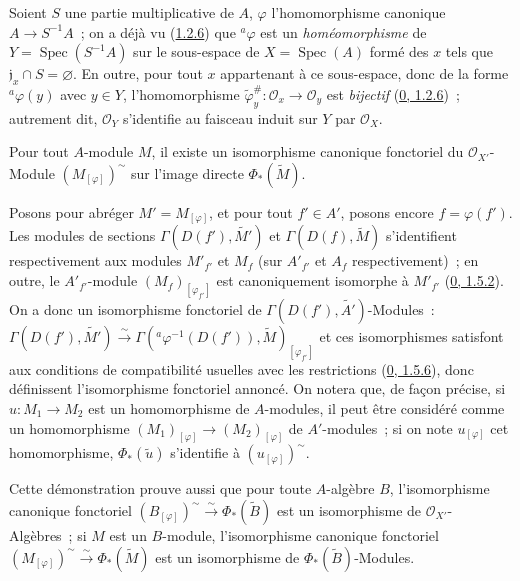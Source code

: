 \begin{example}[1.6.2]
\label{I.1.6.2-fr}
Soient $S$ une partie multiplicative de $A$, $\varphi$ l'homomorphisme
canonique $A\to S^{-1}A$~; on a déjà vu
(\hyperref[I.1.2.6-fr]{1.2.6}) que ${}^a\varphi$ est un
\emph{homéomorphisme} de $Y=\operatorname{Spec}(S^{-1}A)$ sur le
sous-espace de $X=\operatorname{Spec}(A)$ formé des $x$ tels que
$\mathfrak{j}_x\cap S=\varnothing$. En outre, pour tout $x$ appartenant à
ce sous-espace, donc de la forme ${}^a\varphi(y)$ avec $y\in Y$,
l'homomorphisme
$\widetilde{\varphi}_y^\#:\mathscr{O}_x\to\mathscr{O}_y$ est
\emph{bijectif} (\hyperref[0.1.2.6-fr]{0, 1.2.6})~; autrement dit,
$\mathscr{O}_Y$ s'identifie au faisceau induit sur $Y$ par $\mathscr{O}_X$.
\end{example}

\begin{proposition}[1.6.3]
\label{I.1.6.3-fr}
Pour tout $A$-module $M$, il existe un isomorphisme canonique fonctoriel du
$\mathscr{O}_{X'}$-Module $(M_{[\varphi]})^{\sim}$ sur l'image directe
$\Phi_*(\widetilde{M})$.
\end{proposition}

Posons pour abréger $M'=M_{[\varphi]}$, et pour tout $f'\in A'$, posons
encore $f=\varphi(f')$. Les modules de sections
$\Gamma(D(f'),\widetilde{M'})$ et $\Gamma(D(f),\widetilde{M})$
s'identifient respectivement aux modules $M'_{f'}$ et $M_f$ (sur
$A'_{f'}$ et $A_f$ respectivement)~; en outre, le $A'_{f'}$-module
$(M_f)_{[\varphi_{f'}]}$ est canoniquement isomorphe à $M'_{f'}$
(\hyperref[0.1.5.2-fr]{0, 1.5.2}). On a donc un isomorphisme fonctoriel de
$\Gamma(D(f'),\widetilde{A'})$-Modules~:
$\Gamma(D(f'),\widetilde{M'})\xrightarrow{\sim}
\Gamma({}^a\varphi^{-1}(D(f')),\widetilde{M})_{[\varphi_{f'}]}$ et ces
isomorphismes satisfont aux conditions de compatibilité usuelles avec les
restrictions (\hyperref[0.1.5.6-fr]{0, 1.5.6}), donc définissent
l'isomorphisme fonctoriel annoncé. On notera que, de façon précise, si
$u:M_1\to M_2$ est un homomorphisme de $A$-modules, il peut être considéré
comme un homomorphisme $(M_1)_{[\varphi]}\to(M_2)_{[\varphi]}$ de
$A'$-modules~; si on note $u_{[\varphi]}$ cet homomorphisme,
$\Phi_*(\widetilde{u})$ s'identifie à $(u_{[\varphi]})^{\sim}$.

Cette démonstration prouve aussi que pour toute $A$-algèbre $B$,
l'isomorphisme
canonique fonctoriel
$(B_{[\varphi]})^{\sim}\xrightarrow{\sim}\Phi_*(\widetilde{B})$ est un
isomorphisme de $\mathscr{O}_{X'}$-Algèbres~; si $M$ est un $B$-module,
l'isomorphisme canonique fonctoriel
$(M_{[\varphi]})^{\sim}\xrightarrow{\sim}\Phi_*(\widetilde{M})$ est un
isomorphisme de $\Phi_*(\widetilde{B})$-Modules.

